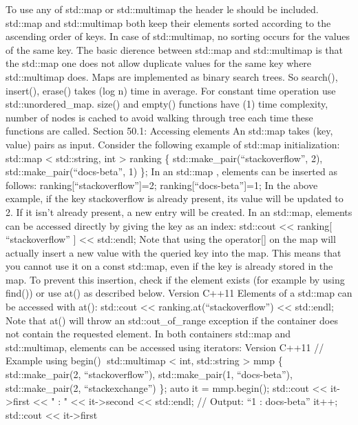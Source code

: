 To use any of std::map or std::multimap the header le should be
included. std::map and std::multimap both keep their elements sorted
according to the ascending order of keys. In case of std::multimap, no
sorting occurs for the values of the same key. The basic dierence
between std::map and std::multimap is that the std::map one does not
allow duplicate values for the same key where std::multimap does. Maps
are implemented as binary search trees. So search(), insert(), erase()
takes (log n) time in average. For constant time operation use
std::unordered\_map. size() and empty() functions have (1) time
complexity, number of nodes is cached to avoid walking through tree each
time these functions are called. Section 50.1: Accessing elements An
std::map takes (key, value) pairs as input. Consider the following
example of std::map initialization: std::map \textless{} std::string,
int \textgreater{} ranking \{ std::make\_pair(``stackoverflow'', 2),
std::make\_pair(``docs-beta'', 1) \}; In an std::map , elements can be
inserted as follows: ranking{[}``stackoverflow''{]}=2;
ranking{[}``docs-beta''{]}=1; In the above example, if the key
stackoverflow is already present, its value will be updated to 2. If it
isn't already present, a new entry will be created. In an std::map,
elements can be accessed directly by giving the key as an index:
std::cout \textless\textless{} ranking{[} ``stackoverflow'' {]}
\textless\textless{} std::endl; Note that using the operator{[}{]} on
the map will actually insert a new value with the queried key into the
map. This means that you cannot use it on a const std::map, even if the
key is already stored in the map. To prevent this insertion, check if
the element exists (for example by using find()) or use at() as
described below. Version C++11 Elements of a std::map can be accessed
with at(): std::cout \textless\textless{} ranking.at(``stackoverflow'')
\textless\textless{} std::endl; Note that at() will throw an
std::out\_of\_range exception if the container does not contain the
requested element. In both containers std::map and std::multimap,
elements can be accessed using iterators: Version C++11 // Example using
begin() std::multimap \textless{} int, std::string \textgreater{} mmp
\{ std::make\_pair(2, ``stackoverflow''), std::make\_pair(1,
``docs-beta''), std::make\_pair(2, ``stackexchange'') \}; auto it =
mmp.begin(); std::cout \textless\textless{} it-\textgreater first
\textless\textless{} " : " \textless\textless{} it-\textgreater second
\textless\textless{} std::endl; // Output: ``1 : docs-beta'' it++;
std::cout \textless\textless{} it-\textgreater first
